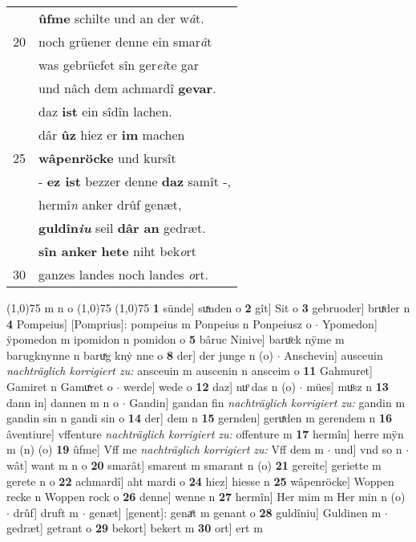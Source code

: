 \documentclass[8pt,a4paper,notitlepage]{article}
\begin{document}
\begin{table}[ht]
\begin{minipage}[t]{0.5\linewidth}
\begin{tabular}{rl}
 & \textbf{ûfme} schilte und an der w\textit{â}t.\\ 
20 & noch grüener denne ein smar\textit{â}t\\ 
 & was gebrüefet sîn ger\textit{ei}te gar\\ 
 & und nâch dem achmardî \textbf{gevar}.\\ 
 & daz \textbf{ist} ein sîdîn lachen.\\ 
 & dâr \textbf{ûz} hiez er \textbf{im} machen\\ 
25 & \textbf{wâpenröcke} und kursît\\ 
 & - \textbf{ez ist} bezzer denne \textbf{daz} samît -,\\ 
 & hermî\textit{n} anker drûf genæt,\\ 
 & \textbf{guldîn\textit{iu}} seil \textbf{dâr an} gedræt.\\ 
 & \textbf{sîn anker} \textbf{hete} niht bek\textit{o}rt\\ 
30 & ganzes landes noch landes \textit{o}rt.\\ 
\end{tabular}
\scriptsize
\line(1,0){75} \newline
m n o \newline
\line(1,0){75} \newline
\newline
\line(1,0){75} \newline
\textbf{1} sünde] suͯnden o \textbf{2} gît] Sit o \textbf{3} gebruoder] bruͯder n \textbf{4} Pompeius] [Pomprius]: pompeius m Ponpeius n Ponpeiusz o  $\cdot$ Ypomedon] ÿpomedon m ipomidon n pomidon o \textbf{5} bâruc Ninive] baruͦck nÿme m barugknynne n baruͯg knẏ nne o \textbf{8} der] der junge n (o)  $\cdot$ Anschevin] ausceuin \textit{nachträglich korrigiert zu:} ansceuin m auscenin n ansceim o \textbf{11} Gahmuret] Gamiret n Gamuͯret o  $\cdot$ werde] wede o \textbf{12} daz] nuͦ das n (o)  $\cdot$ mües] muͦsz n \textbf{13} dann in] dannen m n o  $\cdot$ Gandin] gandan fin \textit{nachträglich korrigiert zu:} gandin m gandin sin n gandi sin o \textbf{14} der] dem n \textbf{15} gernden] geruͯden m gerendem n \textbf{16} âventiure] vffenture \textit{nachträglich korrigiert zu:} offenture m \textbf{17} hermîn] herre mÿn m (n) (o) \textbf{19} ûfme] Vff me \textit{nachträglich korrigiert zu:} Vff dem m  $\cdot$ und] vnd so n  $\cdot$ wât] want m n o \textbf{20} smarât] smarent m smarant n (o) \textbf{21} gereite] geriette m gerete n o \textbf{22} achmardî] aht mardi o \textbf{24} hiez] hiesse n \textbf{25} wâpenröcke] Woppen recke n Woppen rock o \textbf{26} denne] wenne n \textbf{27} hermîn] Her mim m Her min n (o)  $\cdot$ drûf] druft m  $\cdot$ genæt] [genent]: genaͤt m genant o \textbf{28} guldîniu] Guldinen m  $\cdot$ gedræt] getrant o \textbf{29} bekort] bekert m \textbf{30} ort] ert m \newline
\end{minipage}
\end{table}
\end{document}
